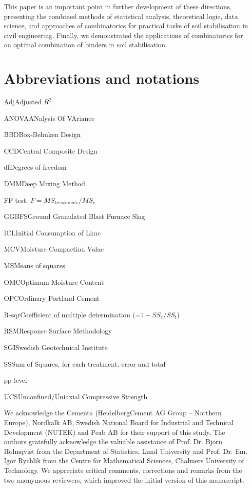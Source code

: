 \documentclass[eprint,
]{actapoly}
\begin{document}
This paper is an important point in further development of these directions, presenting the combined methods of statistical analysis, theoretical logic, data science, and approaches of combinatorics for practical tasks of soil stabilisation in civil engineering. Finally, we demonstrated the applications of combinatorics for an optimal combination of binders in soil stabilisation.

\section{Abbreviations and notations}\label{symb}
\begin{nomenclature}
\item{Adj}{Adjusted $R^2$}
\item{ANOVA}{ANalysis Of VAriance}
\item{BBD}{Box-Behnken Design}
\item{CCD}{Central Composite Design}
\item{df}{Degrees of freedom}
\item{DMM}{Deep Mixing Method}
\item{F}{F test. $F=MS_{treatments}/MS_{e}$}
\item{GGBFS}{Ground Granulated Blast Furnace Slag}
\item{ICL}{Initial Consumption of Lime}
\item{MCV}{Moisture Compaction Value}
\item{MS}{Means of squares}
\item{OMC}{Optimum Moisture Content}
\item{OPC}{Ordinary Portland Cement}
\item{R-sqr}{Coefficient of multiple determination (=$1-SS_{e}/SS_{t}$)}
\item{RSM}{Response Surface Methodology}
\item{SGI}{Swedish Geotechnical Institute}
\item{SS}{Sum of Squares, for each treatment, error and total}
\item{p}{p-level}
\item{UCS}{Unconfined/Uniaxial Compressive Strength}
\end{nomenclature}

\begin{acknowledgements}
We acknowledge the Cementa (HeidelbergCement AG Group -- Northern Europe), Nordkalk AB, Swedish National Board for Industrial and Technical Development (NUTEK) and Peab AB for their support of this study. The authors gratefully acknowledge the valuable assistance of Prof. Dr. Björn Holmqvist from the Department of Statistics, Lund University and Prof. Dr. Em. Igor Rychlik from the Centre for Mathematical Sciences, Chalmers University of Technology. We appreciate critical comments, corrections and remarks from the two anonymous reviewers, which improved the initial version of this manuscript.
\end{acknowledgements}




\end{document}
